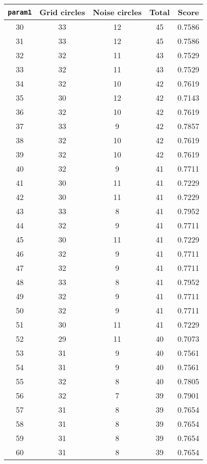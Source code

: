 \documentclass[letterpaper, 12pt]{article}
\begin{document}
\begin{longtable}{|c|c|c|c|c|}
\hline
\textbf{\texttt{param1}} & \textbf{Grid circles} & \textbf{Noise circles} & \textbf{Total} & \textbf{Score} \\
\hline
30 & 33 & 12 & 45 & 0.7586 \\
\hline
31 & 33 & 12 & 45 & 0.7586 \\
\hline
32 & 32 & 11 & 43 & 0.7529 \\
\hline
33 & 32 & 11 & 43 & 0.7529 \\
\hline
34 & 32 & 10 & 42 & 0.7619 \\
\hline
35 & 30 & 12 & 42 & 0.7143 \\
\hline
36 & 32 & 10 & 42 & 0.7619 \\
\hline
37 & 33 & 9 & 42 & 0.7857 \\
\hline
38 & 32 & 10 & 42 & 0.7619 \\
\hline
39 & 32 & 10 & 42 & 0.7619 \\
\hline
40 & 32 & 9 & 41 & 0.7711 \\
\hline
41 & 30 & 11 & 41 & 0.7229 \\
\hline
42 & 30 & 11 & 41 & 0.7229 \\
\hline
43 & 33 & 8 & 41 & 0.7952 \\
\hline
44 & 32 & 9 & 41 & 0.7711 \\
\hline
45 & 30 & 11 & 41 & 0.7229 \\
\hline
46 & 32 & 9 & 41 & 0.7711 \\
\hline
47 & 32 & 9 & 41 & 0.7711 \\
\hline
48 & 33 & 8 & 41 & 0.7952 \\
\hline
49 & 32 & 9 & 41 & 0.7711 \\
\hline
50 & 32 & 9 & 41 & 0.7711 \\
\hline
51 & 30 & 11 & 41 & 0.7229 \\
\hline
52 & 29 & 11 & 40 & 0.7073 \\
\hline
53 & 31 & 9 & 40 & 0.7561 \\
\hline
54 & 31 & 9 & 40 & 0.7561 \\
\hline
55 & 32 & 8 & 40 & 0.7805 \\
\hline
56 & 32 & 7 & 39 & 0.7901 \\
\hline
57 & 31 & 8 & 39 & 0.7654 \\
\hline
58 & 31 & 8 & 39 & 0.7654 \\
\hline
59 & 31 & 8 & 39 & 0.7654 \\
\hline
60 & 31 & 8 & 39 & 0.7654 \\
\hline

\end{longtable}
\end{document}
